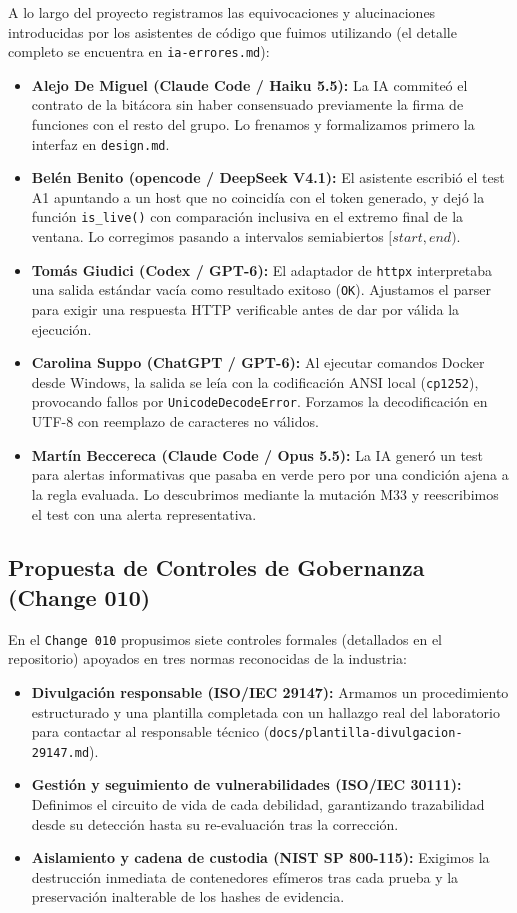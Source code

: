 \documentclass[10pt,a4paper]{article}
\begin{document}
A lo largo del proyecto registramos las equivocaciones y alucinaciones introducidas por los asistentes de código que fuimos utilizando (el detalle completo se encuentra en \texttt{ia-errores.md}):

\begin{itemize}[noitemsep,topsep=3pt]
    \item \textbf{Alejo De Miguel (Claude Code / Haiku 5.5):} La IA commiteó el contrato de la bitácora sin haber consensuado previamente la firma de funciones con el resto del grupo. Lo frenamos y formalizamos primero la interfaz en \texttt{design.md}.
    \item \textbf{Belén Benito (opencode / DeepSeek V4.1):} El asistente escribió el test A1 apuntando a un host que no coincidía con el token generado, y dejó la función \texttt{is\_live()} con comparación inclusiva en el extremo final de la ventana. Lo corregimos pasando a intervalos semiabiertos $[start, end)$.
    \item \textbf{Tomás Giudici (Codex / GPT-6):} El adaptador de \texttt{httpx} interpretaba una salida estándar vacía como resultado exitoso (\texttt{OK}). Ajustamos el parser para exigir una respuesta HTTP verificable antes de dar por válida la ejecución.
    \item \textbf{Carolina Suppo (ChatGPT / GPT-6):} Al ejecutar comandos Docker desde Windows, la salida se leía con la codificación ANSI local (\texttt{cp1252}), provocando fallos por \texttt{UnicodeDecodeError}. Forzamos la decodificación en UTF-8 con reemplazo de caracteres no válidos.
    \item \textbf{Martín Beccereca (Claude Code / Opus 5.5):} La IA generó un test para alertas informativas que pasaba en verde pero por una condición ajena a la regla evaluada. Lo descubrimos mediante la mutación M33 y reescribimos el test con una alerta representativa.
\end{itemize}

\subsection{Propuesta de Controles de Gobernanza (Change 010)}

En el \texttt{Change 010} propusimos siete controles formales (detallados en el repositorio) apoyados en tres normas reconocidas de la industria:
\begin{itemize}[noitemsep]
    \item \textbf{Divulgación responsable (ISO/IEC 29147):} Armamos un procedimiento estructurado y una plantilla completada con un hallazgo real del laboratorio para contactar al responsable técnico (\texttt{docs/plantilla-divulgacion-29147.md}).
    \item \textbf{Gestión y seguimiento de vulnerabilidades (ISO/IEC 30111):} Definimos el circuito de vida de cada debilidad, garantizando trazabilidad desde su detección hasta su re-evaluación tras la corrección.
    \item \textbf{Aislamiento y cadena de custodia (NIST SP 800-115):} Exigimos la destrucción inmediata de contenedores efímeros tras cada prueba y la preservación inalterable de los hashes de evidencia.
\end{itemize}
\end{document}
